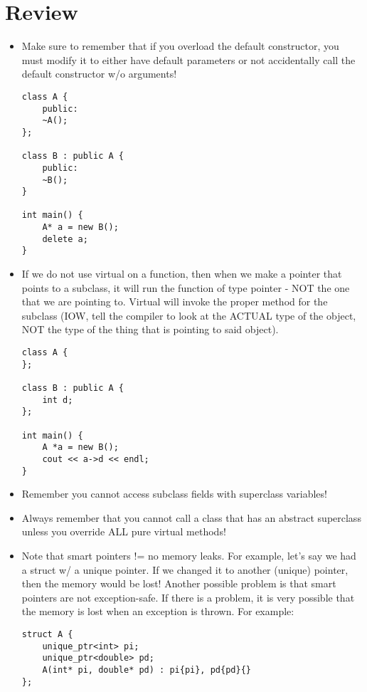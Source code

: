 \documentclass{article}
\begin{document}
\section{Review}
\begin{itemize}
\begin{lstlisting}
class A {
    public:
    A(int x, int y);
};

int main() {
    A a;
}
\end{lstlisting}
\item Make sure to remember that if you overload the default constructor, you must modify it to either have default parameters or not accidentally call the default constructor w/o arguments!
\begin{lstlisting}
class A {
    public:
    ~A();
};

class B : public A {
    public:
    ~B();
}

int main() {
    A* a = new B();
    delete a;
}
\end{lstlisting}
\item If we do not use virtual on a function, then when we make a pointer that points to a subclass, it will run the function of type pointer - NOT the one that we are pointing to.  Virtual will invoke the proper method for the subclass (IOW, tell the compiler to look at the ACTUAL type of the object, NOT the type of the thing that is pointing to said object).
\begin{lstlisting}
class A {
};

class B : public A {
    int d;
};

int main() {
    A *a = new B();
    cout << a->d << endl;
}
\end{lstlisting}
\item Remember you cannot access subclass fields with superclass variables!
\item Always remember that you cannot call a class that has an abstract superclass unless you override ALL pure virtual methods!
\item Note that smart pointers != no memory leaks.  For example, let's say we had a struct w/ a unique pointer.  If we changed it to another (unique) pointer, then the memory would be lost!  Another possible problem is that smart pointers are not exception-safe.  If there is a problem, it is very possible that the memory is lost when an exception is thrown.  For example:
\begin{lstlisting}
struct A {
    unique_ptr<int> pi;
    unique_ptr<double> pd;
    A(int* pi, double* pd) : pi{pi}, pd{pd}{}
};


\end{lstlisting}
\end{itemize}
\end{document}
